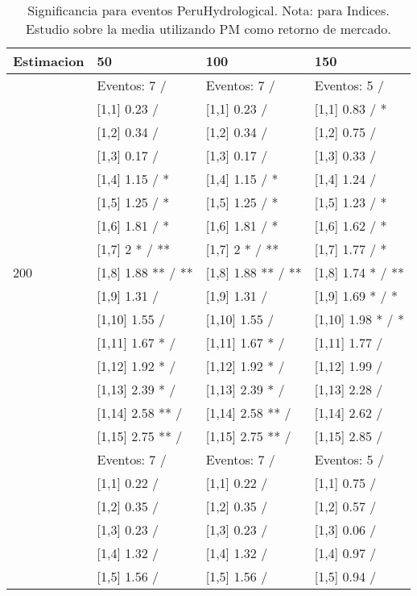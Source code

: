 \begin{table}

\caption{Significancia para eventos PeruHydrological. Nota: para Indices. Estudio sobre la media utilizando PM como retorno de mercado.}
\centering
\begin{tabular}[t]{llll}
\toprule
Estimacion & 50 & 100 & 150\\
\midrule
 & Eventos:  7 / & Eventos:  7 / & Eventos:  5 /\\
 & {}[1,1] 0.23  / & {}[1,1] 0.23  / & {}[1,1] 0.83  / *\\
 & {}[1,2] 0.34  / & {}[1,2] 0.34  / & {}[1,2] 0.75  /\\
 & {}[1,3] 0.17  / & {}[1,3] 0.17  / & {}[1,3] 0.33  /\\
 & {}[1,4] 1.15  / * & {}[1,4] 1.15  / * & {}[1,4] 1.24  /\\
\addlinespace
 & {}[1,5] 1.25  / * & {}[1,5] 1.25  / * & {}[1,5] 1.23  / *\\
 & {}[1,6] 1.81  / * & {}[1,6] 1.81  / * & {}[1,6] 1.62  / *\\
 & {}[1,7] 2 * / ** & {}[1,7] 2 * / ** & {}[1,7] 1.77  / *\\
200 & {}[1,8] 1.88 ** / ** & {}[1,8] 1.88 ** / ** & {}[1,8] 1.74 * / **\\
 & {}[1,9] 1.31  / & {}[1,9] 1.31  / & {}[1,9] 1.69 * / *\\
\addlinespace
 & {}[1,10] 1.55  / & {}[1,10] 1.55  / & {}[1,10] 1.98 * / *\\
 & {}[1,11] 1.67 * / & {}[1,11] 1.67 * / & {}[1,11] 1.77  /\\
 & {}[1,12] 1.92 * / & {}[1,12] 1.92 * / & {}[1,12] 1.99  /\\
 & {}[1,13] 2.39 * / & {}[1,13] 2.39 * / & {}[1,13] 2.28  /\\
 & {}[1,14] 2.58 ** / & {}[1,14] 2.58 ** / & {}[1,14] 2.62  /\\
\addlinespace
 & {}[1,15] 2.75 ** / & {}[1,15] 2.75 ** / & {}[1,15] 2.85  /\\
 & Eventos:  7 / & Eventos:  7 / & Eventos:  5 /\\
 & {}[1,1] 0.22  / & {}[1,1] 0.22  / & {}[1,1] 0.75  /\\
 & {}[1,2] 0.35  / & {}[1,2] 0.35  / & {}[1,2] 0.57  /\\
 & {}[1,3] 0.23  / & {}[1,3] 0.23  / & {}[1,3] 0.06  /\\
\addlinespace
 & {}[1,4] 1.32  / & {}[1,4] 1.32  / & {}[1,4] 0.97  /\\
 & {}[1,5] 1.56  / & {}[1,5] 1.56  / & {}[1,5] 0.94  /\\

\end{tabular}
\end{table}
